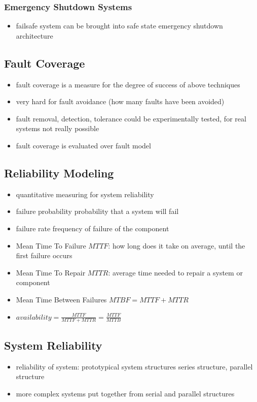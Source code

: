 \documentclass[a4paper, 10pt]{article}
\begin{document}
\subsubsection*{Emergency Shutdown Systems}
\begin{itemize}
    \item failsafe \follows system can be brought into safe state \follows emergency shutdown architecture
\end{itemize}

\subsection*{Fault Coverage}
\begin{itemize}
    \item fault coverage is a measure for the degree of success of above techniques
    \item very hard for fault avoidance (how many faults have been avoided)
    \item fault removal, detection, tolerance \follows could be experimentally tested, for real systems not really possible
    \item fault coverage is evaluated over fault model
\end{itemize}

\subsection*{Reliability Modeling}
\begin{itemize}
    \item quantitative measuring for system reliability
    \item failure probability \follows probability that a system will fail
    \item failure rate \follows frequency of failure of the component
    \item Mean Time To Failure $MTTF$: how long does it take on average, until the first failure occurs
    \item Mean Time To Repair $MTTR$: average time needed to repair a system or component
    \item Mean Time Between Failures $MTBF=MTTF+MTTR$
    \item $availability=\frac{MTTF}{MTTF+MTTR} = \frac{MTTF}{MTTB}$
\end{itemize}

\subsection*{System Reliability}
\begin{itemize}
    \item reliability of system: prototypical system structures \follows series structure, parallel structure
    \item more complex systems \follows put together from serial and parallel structures
\end{itemize}

\end{document}
